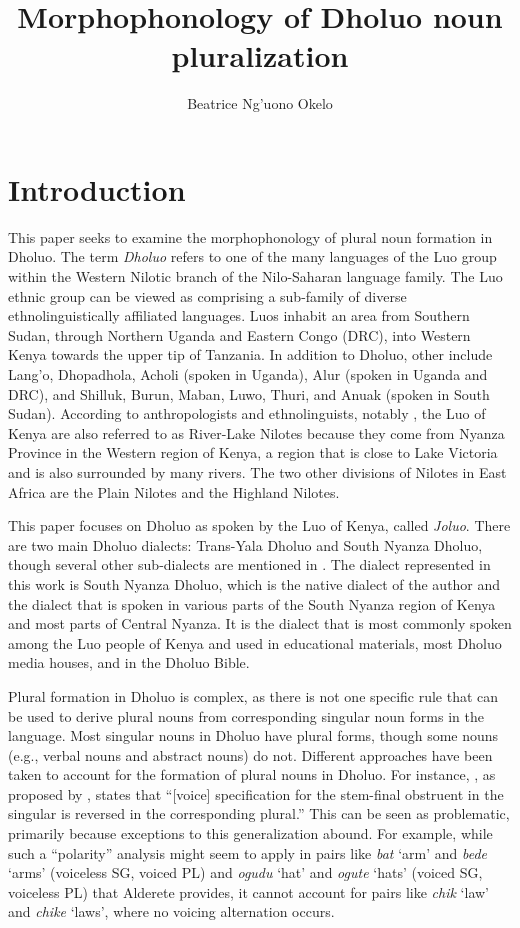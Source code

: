 \documentclass[output=paper,colorlinks,citecolor=brown]{langscibook}
\author{Beatrice Ng'uono Okelo\affiliation{Indiana University}}
\title{Morphophonology of Dholuo noun pluralization}
\begin{document}
\maketitle

\section{Introduction}

This paper seeks to examine the morphophonology of plural noun formation in Dholuo. The term \textit{Dholuo} refers to one of the many languages of the Luo group within the Western Nilotic branch of the Nilo-Saharan language family. The Luo ethnic group can be viewed as comprising a sub-family of diverse ethnolinguistically affiliated languages. Luos inhabit an area from Southern Sudan, through Northern Uganda and Eastern Congo (DRC), into Western Kenya towards the upper tip of Tanzania. In addition to Dholuo, other  include Lang’o, Dhopadhola, Acholi (spoken in Uganda), Alur (spoken in Uganda and DRC), and Shilluk, Burun, Maban, Luwo, Thuri, and Anuak (spoken in South Sudan). According to anthropologists and ethnolinguists, notably \citet{Ndeda2019}, the Luo of Kenya are also referred to as River-Lake Nilotes because they come from Nyanza Province in the Western region of Kenya, a region that is close to Lake Victoria and is also surrounded by many rivers. The two other divisions of Nilotes in East Africa are the Plain Nilotes and the Highland Nilotes.

This paper focuses on Dholuo as spoken by the Luo of Kenya, called \textit{Joluo}. There are two main Dholuo dialects: Trans-Yala Dholuo and South Nyanza Dholuo, though several other sub-dialects are mentioned in \citet{Tucker1994}. The dialect represented in this work is South Nyanza Dholuo, which is the native dialect of the author and the dialect that is spoken in various parts of the South Nyanza region of Kenya and most parts of Central Nyanza. It is the dialect that is most commonly spoken among the Luo people of Kenya and used in educational materials, most Dholuo media houses, and in the Dholuo Bible.

Plural formation in Dholuo is complex, as there is not one specific rule that can be used to derive plural nouns from corresponding singular noun forms in the language. Most singular nouns in Dholuo have plural forms, though some nouns (e.g., verbal nouns and abstract nouns) do not. Different approaches have been taken to account for the formation of plural nouns in Dholuo. For instance, , as proposed by \citet[16]{Alderete1999}, states that “[voice] specification for the stem-final obstruent in the singular is reversed in the corresponding plural.” This can be seen as problematic, primarily because exceptions to this generalization abound. For example, while such a ``polarity'' analysis might seem to apply in pairs like \textit{bat} `arm' and \textit{bede} `arms' (voiceless \textsc{SG}, voiced \textsc{PL}) and \textit{ogudu} `hat' and \textit{ogute} `hats' (voiced \textsc{SG}, voiceless \textsc{PL}) that Alderete provides, it cannot account for pairs like \textit{chik} `law' and \textit{chike} `laws', where no voicing alternation occurs.
\end{document}
